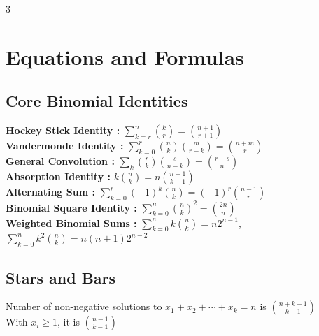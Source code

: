 \begin{multicols*}{3}
\newpage
\section{Equations and Formulas}

\subsection{Core Binomial Identities}
\textbf{Hockey Stick Identity : } $\displaystyle \sum_{k=r}^{n}{k \choose r}={n+1 \choose r+1}$ \\
\textbf{Vandermonde Identity : } $\displaystyle \sum_{k=0}^{r}{n \choose k}{m \choose r-k}={n+m \choose r}$ \\
\textbf{General Convolution : } $\displaystyle \sum_{k}{r \choose k}{s \choose n-k}={r+s \choose n}$ \\
\textbf{Absorption Identity : } $\displaystyle k{n \choose k}=n{n-1 \choose k-1}$ \\
\textbf{Alternating Sum : } $\displaystyle \sum_{k=0}^{r}(-1)^{k}{n \choose k}=(-1)^{r}{n-1 \choose r}$ \\
\textbf{Binomial Square Identity : } $\displaystyle \sum_{k=0}^{n}{n \choose k}^{2}={2n \choose n}$ \\
\textbf{Weighted Binomial Sums : } $\displaystyle \sum_{k=0}^{n}k{n \choose k}=n2^{n-1}$, $\displaystyle \sum_{k=0}^{n}k^{2}{n \choose k}=n(n+1)2^{n-2}$ \\

\subsection{Stars and Bars}
Number of non-negative solutions to $\displaystyle x_{1}+x_{2}+\cdots+x_{k}=n$ is $\displaystyle {n+k-1 \choose k-1}$ \\
With $\displaystyle x_{i}\ge1$, it is $\displaystyle {n-1 \choose k-1}$ \\


\end{multicols*}
